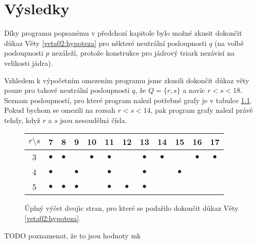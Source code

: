 \chapter{Výsledky} \label{vysledky}

Díky programu popsanému v předchozí kapitole bylo možné zkusit dokončit důkaz Věty \ref{veta02:hypoteza} pro některé neutrální posloupnosti $q$ (na volbě posloupnosti $p$ nezáleží, protože konstrukce pro jádrový triark nezávisí na velikosti jádra). 

Vzhledem k výpočetním omezením programu jsme zkusili dokončit důkaz věty pouze pro takové neutrální posloupnosti $q$, že $Q = \lbrace r, s\rbrace$ a navíc $r<s<18$. Seznam posloupností, pro které program nalezl potřebné grafy je v tabulce \ref{obr03:tabvysledky}. Pokud bychom se omezili na rozsah $r<s<14$, pak program grafy nalezl právě tehdy, když $r$ a $s$ jsou nesoudělná čísla.

\begin{figure}[h]\centering
\begin{tabular}{ c | c c c c c c c c c c c }
  {$r\setminus s$} & 7 & 8 & 9 & 10 & 11 & 12 & 13 & 14 & 15 & 16 & 17 \\ \hline
  3 & $\bullet$ & $\bullet$ &  & $\bullet$ & $\bullet$ &  & $\bullet$ & $\bullet$ &  & $\bullet$ & $\bullet$ \\
  4 & $\bullet$ &  & $\bullet$ &  & $\bullet$ &  & $\bullet$ &  & $\bullet$ \\
  5 & $\bullet$ & $\bullet$ & $\bullet$ &  & $\bullet$ & $\bullet$ & $\bullet$  
\end{tabular}
\caption{Úplný výčet dvojic stran, pro které se podařilo dokončit důkaz Věty \ref{veta02:hypoteza}.}
\label{obr03:tabvysledky}
\end{figure}


TODO poznamenat, že to jsou hodnoty mk


